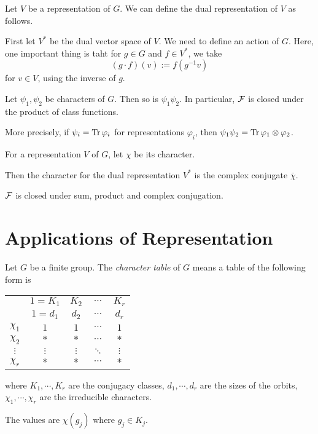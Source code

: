 \documentclass{article}
\begin{document}
\begin{definition}
  Let \(V\) be a representation of \(G\).
  We can define the dual representation of \(V\) as follows.

  First let \(V^*\) be the dual vector space of \(V\).
  We need to define an action of \(G\).
  Here, one important thing is taht for \(g \in G\)
  and \(f \in V^*\),
  we take
  \[(g \cdot f)(v) := f(g^{-1}v)\]
  for \(v \in V\), using the inverse of \(g\).
\end{definition}

\begin{theorem}
  Let \(\psi_1, \psi_2\) be characters of \(G\).
  Then so is \(\psi_1 \psi_2\).
  In particular, \(\mathcal{F}\) is closed under the product of class functions.

  More precisely, if \(\psi_i = \operatorname{Tr}\varphi_i\) for representations \(\varphi_i\),
  then \(\psi_1 \psi_2 = \operatorname{Tr} \varphi_1 \otimes \varphi_2\).
\end{theorem}

\begin{theorem}
  For a representation \(V\) of \(G\),
  let \(\chi\) be its character.

  Then the character for the dual representation \(V^*\)
  is the complex conjugate \(\overline{\chi}\).
\end{theorem}

\begin{corollary}
  \(\mathcal{F}\) is closed under sum, product and complex conjugation.
\end{corollary}

\section*{Applications of Representation}

\begin{definition}
  Let \(G\) be a finite group.
  The \emph{character table} of \(G\) means a table of the following form is
  \begin{center}
    \begin{tabular}{c | c c c c}
      & \(1 = K_1\) & \(K_2\) & \(\cdots\) & \(K_r\) \\
      & \(1 = d_1\) & \(d_2\) & \(\cdots\) & \(d_r\) \\
      \hline
      \(\chi_1\) & \(1\) & \(1\) & \(\cdots\) & \(1\) \\
      \(\chi_2\) & \(*\) & \(*\) & \(\cdots\) & \(*\) \\
      \(\vdots\) & \(\vdots\) & \(\vdots\) & \(\ddots\) & \(\vdots\) \\
      \(\chi_r\) & \(*\) & \(*\) & \(\cdots\) & \(*\) \\
    \end{tabular}
  \end{center}
  where \(K_1, \cdots, K_r\) are the conjugacy classes,
  \(d_1, \cdots, d_r\) are the sizes of the orbits,
  \(\chi_1, \cdots, \chi_r\) are the irreducible characters.

  The values are \(\chi(g_j)\) where \(g_j \in K_j\).
\end{definition}
\end{document}
